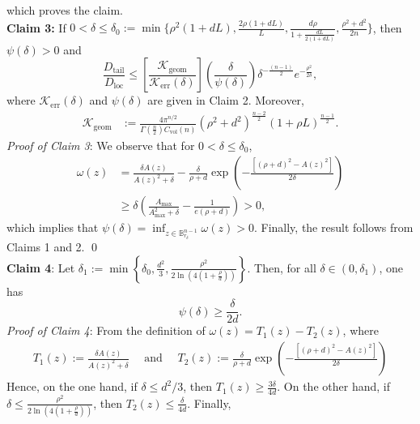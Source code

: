 \documentclass[11pt]{amsart}
\newcommand{\1}{\mathds{1}}
\theoremstyle{definition}
\theoremstyle{remark}
\theoremstyle{definition}
\begin{document}
which proves the claim.\\
\textbf{Claim 3:} If $0<\delta \leq  \delta_0:=\min \big\{ \rho^2(1+dL),  \frac{2\rho(1+dL)}{L},  \frac{d\rho}{1 + \frac{dL}{2(1+dL)}},\frac{\rho^2+d^2}{2n} \big\}$, then $\psi(\delta)>0$ and 
$$
\frac{D_{\operatorname{tail}}}{D_{\operatorname{loc}}}
\leq \left[\frac{\mathcal{K}_{\operatorname{geom}}}{\mathcal{K}_{\operatorname{err}}(\delta)}\right] \left(\frac{\delta}{\psi(\delta)}\right) \delta^{-\frac{(n-1)}{2}}e^{-\frac{\rho^2}{2\delta}},
$$
where $\mathcal{K}_{\operatorname{err}}(\delta)$ and $\psi(\delta)$ are given in Claim 2. Moreover, 
\begin{equation*}
    \begin{aligned}
\mathcal{K}_{\operatorname{geom}}&:=\frac{4\pi^{n/2}}{\Gamma\left(\frac{n}{2}\right) C_{\operatorname{vol}}(n)}(\rho^2+d^2)^{\frac{n-2}{2}}(1+\rho L)^{\frac{n-1}{2}}.
\end{aligned}
\end{equation*}
\emph{Proof of Claim 3}: We  observe that for $0<\delta \leq \delta_0$,
\begin{equation*}
    \begin{aligned}
    \omega(z)&=\frac{\delta A(z)}{A(z)^2+\delta}-\frac{\delta}{\rho+d} \exp\left(-\frac{\left[(\rho+d)^2-A(z)^2\right]}{2\delta}\right)\\
    &\geq \delta \left(\frac{A_{\operatorname{max}}}{A_{\operatorname{max}}^2+\delta}-\frac{1}{e(\rho+d)}\right)>0,
    \end{aligned}
\end{equation*}
which implies that $\psi(\delta)=\inf_{z\in \mathbb{B}^{n-1}_{r_{\delta}}}\omega(z)>0$. Finally, the result follows from Claims 1 and  2. \qed\\
\noindent \textbf{Claim 4}: Let $\delta_1:=\min\left\{ \delta_0,\frac{d^2}{3}, \frac{\rho^2}{2\ln\!\left(4\left(1+\frac{\rho}{d}\right)\right)}\right\}$. Then, for all $\delta \in (0,\delta_1)$, one has 
\[
\psi(\delta)\geq \frac{\delta}{2d}.
\]
\emph{Proof of Claim 4}: From the definition of $\omega(z)=T_1(z)-T_2(z)$, where
\begin{equation*}
    \begin{aligned}
    T_1(z):=\frac{\delta A(z)}{A(z)^2+\delta}\quad \textrm{ and } \quad  T_2(z):=\frac{\delta}{\rho+d} \exp\left(-\frac{\left[(\rho+d)^2-A(z)^2\right]}{2\delta}\right)
    \end{aligned}
\end{equation*}
Hence, on the one hand, if $\delta \leq d^2/3$, then $T_1(z)\geq \frac{3\delta}{4d}$. On the other hand, if $\delta \leq \frac{\rho^2}{2\ln\left(4(1+\frac{\rho}{d})\right)}$, then $T_2(z)\leq \frac{\delta}{4d}$. Finally,
\end{document}
